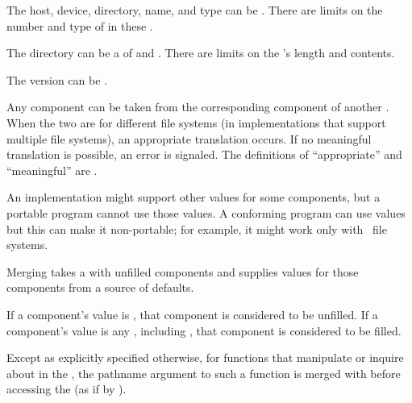 \itemitem{\bull}
  The host, device, directory, name, and type can be .  There
  are  limits on the number and type of
   in these .
  
\itemitem{\bull}
  The directory can be a  of  and .
  There are  limits on the 's
  length and contents.
  
\itemitem{\bull}
  The version can be .
 
\itemitem{\bull}
  Any component can be taken 
  from the corresponding component of another .
  When the two  are for different file systems
    (in implementations that support multiple file systems),
  an appropriate translation occurs.
  If no meaningful translation is possible,
  an error is signaled.
  The definitions of ``appropriate'' and ``meaningful'' 
  are .
  
\itemitem{\bull}
  An implementation might support other values for some components,
  but a portable program cannot use those values.
  A conforming program can use  values
  but this can make it non-portable;
  for example, it might work only with \Unix\ file systems.
\endlist                                   


\endsubsubsection%


\endSubsection%


Merging takes a  with unfilled components
and supplies values for those components from a source of defaults.

If a component's value is \nil, that component is considered to be unfilled.
If a component's value is any  , 
including , that component is considered to be filled.

Except as explicitly specified otherwise,
for functions that manipulate or inquire about  in the ,
the pathname argument to such a function
is merged with  before accessing the 
(as if by ).

